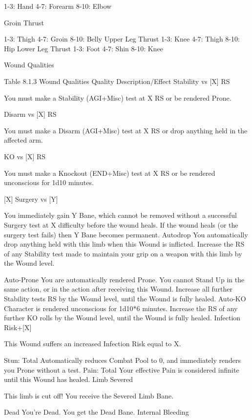 \documentclass[oneside,11pt,english]{book}
\begin{document}
 

1-3: Hand 
4-7: Forearm 
8-10: Elbow 

Groin Thrust 

 

1-3: Thigh 
4-7: Groin 
8-10: Belly 
Upper Leg Thrust 1-3: Knee 
4-7: Thigh 
8-10: Hip 
Lower Leg Thrust 1-3: Foot 
4-7: Shin 
8-10: Knee 
 

 

Wound Qualities 

 
Table 8.1.3 Wound Qualities 
Quality Description/Effect 
Stability vs 
[X] RS 

You must make a Stability (AGI+Misc) test at X RS or be rendered Prone. 

Disarm vs 
[X] RS 

You must make a Disarm (AGI+Misc) test at X RS or drop anything held in the affected arm. 

KO vs [X] 
RS 

You must make a Knockout (END+Misc) test at X RS or be rendered unconscious for 1d10 
minutes. 

[X] Surgery 
vs [Y] 

You immediately gain Y Bane, which cannot be removed without a successful Surgery test at X 
difficulty before the wound heals. If the wound heals (or the surgery test fails) then Y Bane 
becomes permanent. 
Autodrop You automatically drop anything held with this limb when this Wound is inflicted. Increase the RS 
of any Stability test made to maintain your grip on a weapon with this limb by the Wound level. 


Auto-Prone You are automatically rendered Prone. You cannot Stand Up in the same action, or in the action 
after receiving this Wound. Increase all further Stability tests RS by the Wound level, until the 
Wound is fully healed. 
Auto-KO Character is rendered unconscious for 1d10*6 minutes. Increase the RS of any further KO rolls by 
the Wound level, until the Wound is fully healed. 
Infection 
Risk+[X] 

This Wound suffers an increased Infection Risk equal to X. 

Stun: Total Automatically reduces Combat Pool to 0, and immediately renders you Prone without a test. 
Pain: Total Your effective Pain is considered infinite until this Wound has healed. 
Limb 
Severed 

This limb is cut off! You receive the Severed Limb Bane. 

Dead You’re Dead. You get the Dead Bane. 
Internal 
Bleeding 
\end{document}
